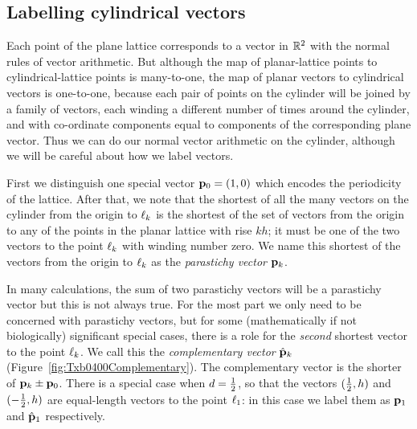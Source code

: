 \subsection{Labelling cylindrical vectors}
Each point of the plane lattice corresponds to a 
vector in $\mathbb{R}^2$ with the normal rules of vector arithmetic. But although the map of planar-lattice points to cylindrical-lattice points is many-to-one, the map of planar vectors to cylindrical vectors is one-to-one, because each pair of points on the cylinder will be joined by a family of vectors, each winding a different number of times around the cylinder, and with co-ordinate components equal to components of the corresponding plane vector.   Thus we can do our normal vector arithmetic on the cylinder, although we will  be careful about how we label vectors. 

First we distinguish one special vector ${\mathbf p}_{0}=(1,0)$ which encodes the periodicity of the lattice. After that, we note that the shortest of all the many vectors on the cylinder from the origin to $\ell_{{k}}$ is the shortest of the set of vectors from the origin to any of the points in the planar lattice with rise $kh$; it must be one of the two vectors to the point $\ell_{{k}}$ with winding number zero. 
We name this shortest of the vectors from the origin to $\ell_{{k}}$ as  the \textit{parastichy vector} ${\mathbf p}_{k}$.

In many calculations, the sum of two parastichy vectors will be a parastichy vector but this is not always true. 
For the most part we only need to be concerned with parastichy vectors, but for some (mathematically if not biologically)  significant special cases,  there is a role for the \textit{second} shortest vector to the point $\ell_{{k}}$. We call this the \emph{complementary vector} $\hat{\mathbf p}_{k}$ (Figure~\ref{fig:Txb0400Complementary}). The complementary vector is the shorter of ${\mathbf p}_{k}\pm {\mathbf p}_{0}$. There is a  special case when $d=\textstyle{\frac{1}{2}}$, so that the vectors $(\textstyle{\frac{1}{2}},h)$ and $(-\textstyle{\frac{1}{2}},h)$ are equal-length vectors to the point $\ell_{{1}}$: in this case we label them as ${\mathbf p}_{1}$ and $\hat{\mathbf p}_{1}$ respectively.



